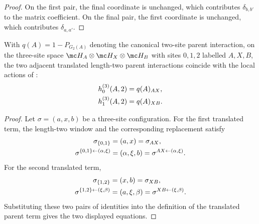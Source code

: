\begin{proof}
    \leanok
    On the first pair, the final coordinate is unchanged, which contributes
    $\delta_{b,b'}$ to the matrix coefficient. On the final pair, the first
    coordinate is unchanged, which contributes $\delta_{a,a'}$.
\end{proof}

\begin{lemma}
    \label{thm:local_term_two_three_ax_xb_lifts}
    \leanok
    With $q(A)=1-P_{G_2(A)}$ denoting the canonical two-site parent
    interaction, on the three-site space
    $\mc H_A\otimes\mc H_X\otimes\mc H_B$ with sites $0,1,2$ labelled
    $A,X,B$, the two adjacent translated length-two parent interactions
    coincide with the local actions of
    \cite[Definition~D.2]{Cirac2016MPDO_arXiv}:
    \begin{align}
        h^{(3)}_0(A,2) & =q(A)_{AX},
        \notag                       \\
        h^{(3)}_1(A,2) & =q(A)_{XB}.
        \notag
    \end{align}
\end{lemma}

\begin{proof}\leanok
    Let $\sigma=(a,x,b)$ be a three-site configuration. For the first
    translated term, the length-two window and the corresponding replacement
    satisfy
    \begin{align}
        \sigma_{\{0,1\}} & =(a,x)=\sigma_{AX},
        \notag                                 \\
        \sigma^{\{0,1\}\leftarrow(\alpha,\xi)}
                         & =(\alpha,\xi,b)
        =\sigma^{AX\leftarrow(\alpha,\xi)}.
        \notag
    \end{align}
    For the second translated term,
    \begin{align}
        \sigma_{\{1,2\}} & =(x,b)=\sigma_{XB},
        \notag                                 \\
        \sigma^{\{1,2\}\leftarrow(\xi,\beta)}
                         & =(a,\xi,\beta)
        =\sigma^{XB\leftarrow(\xi,\beta)}.
        \notag
    \end{align}
    Substituting these two pairs of identities into the definition of the
    translated parent term gives the two displayed equations.
\end{proof}

